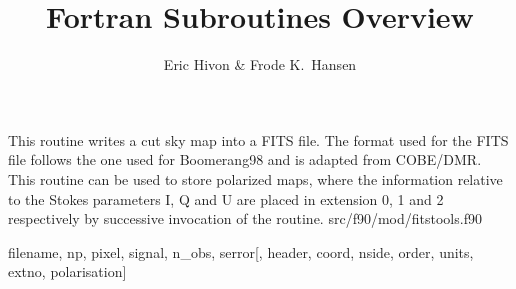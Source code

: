 
\sloppy


\title{\healpix Fortran Subroutines Overview}
 \section[write\_fits\_cut4]{ }
\label{sub:write_fits_cut4}
\author{Eric Hivon \& Frode K.~Hansen}

\begin{facility}
{This routine writes a cut sky \healpix map into a FITS file. The format used for the
FITS file follows the one used for Boomerang98 and is adapted from COBE/DMR. 
This routine can be used to store polarized maps, where the
information relative to the Stokes parameters I, Q and U are placed in extension
0, 1 and 2 respectively by successive invocation of the routine.}
{src/f90/mod/fitstools.f90}
\end{facility}

\begin{f90format}
{filename, np, pixel, signal, n\_obs, serror[, header, coord, nside, order,
units, extno, polarisation]}
\end{f90format}

